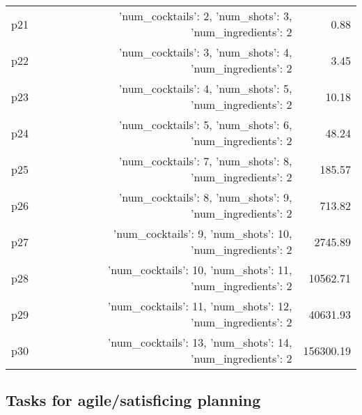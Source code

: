 \documentclass{article}
\begin{document}
\begin{center}
\begin{tabular}{@{}l|r|r@{}}
  p21&{'num\_cocktails': 2, 'num\_shots': 3, 'num\_ingredients': 2}&0.88\\
  p22&{'num\_cocktails': 3, 'num\_shots': 4, 'num\_ingredients': 2}&3.45\\
  p23&{'num\_cocktails': 4, 'num\_shots': 5, 'num\_ingredients': 2}&10.18\\
  p24&{'num\_cocktails': 5, 'num\_shots': 6, 'num\_ingredients': 2}&48.24\\
  p25&{'num\_cocktails': 7, 'num\_shots': 8, 'num\_ingredients': 2}&185.57\\
  p26&{'num\_cocktails': 8, 'num\_shots': 9, 'num\_ingredients': 2}&713.82\\
  p27&{'num\_cocktails': 9, 'num\_shots': 10, 'num\_ingredients': 2}&2745.89\\
  p28&{'num\_cocktails': 10, 'num\_shots': 11, 'num\_ingredients': 2}&10562.71\\
  p29&{'num\_cocktails': 11, 'num\_shots': 12, 'num\_ingredients': 2}&40631.93\\
  p30&{'num\_cocktails': 13, 'num\_shots': 14, 'num\_ingredients': 2}&156300.19
                            \end{tabular}
                            \end{center}
                    

                                \subsection*{Tasks for agile/satisficing planning}
                                
\end{document}
